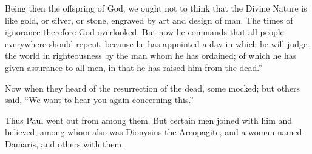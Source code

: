 {Being then the offspring of God, we ought not to think that the Divine Nature is like gold, or silver, or stone, engraved by art and design of man.
The times of ignorance therefore God overlooked. But now he commands that all people everywhere should repent,
because he has appointed a day in which he will judge the world in righteousness by the man whom he has ordained; of which he has given assurance to all men, in that he has raised him from the dead.”
\par }{\PP {}Now when they heard of the resurrection of the dead, some mocked; but others said, “We want to hear you again concerning this.”
\par }{\PP {}Thus Paul went out from among them.
But certain men joined with him and believed, among whom also was Dionysius the Areopagite, and a woman named Damaris, and others with them.

}
